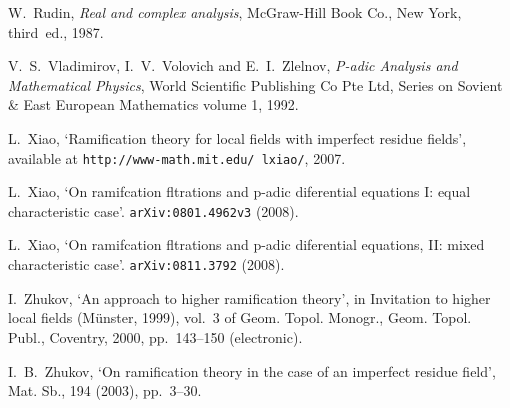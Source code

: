 \documentclass{lmsMODIFIED}
\begin{document}
\begin{thebibliography}{9}
{\sc W.~Rudin}, {\em Real and complex analysis}, McGraw-Hill Book Co., New
  York, third~ed., 1987.

{\sc V.~S.~Vladimirov, I.~V.~Volovich and E.~I.~Zlelnov}, {\em P-adic Analysis and Mathematical Physics}, World Scientific Publishing Co Pte Ltd, Series on Sovient \& East European Mathematics volume 1, 1992.

{\sc L.~Xiao}, {`Ramification theory for local fields with imperfect residue fields'}, available at {\tt http://www-math.mit.edu/~lxiao/}, 2007.

{\sc L.~Xiao}, {`On ramifcation fltrations and p-adic diferential equations {I}: equal characteristic case'}. {\tt arXiv:0801.4962v3} (2008).

{\sc L.~Xiao}, {`On ramifcation fltrations and p-adic diferential equations, {I}{I}: mixed characteristic case'}. {\tt arXiv:0811.3792} (2008).

{\sc I.~Zhukov}, {`An approach to higher ramification theory'}, in Invitation
  to higher local fields (M\"unster, 1999), vol.~3 of Geom. Topol. Monogr.,
  Geom. Topol. Publ., Coventry, 2000, pp.~143--150 (electronic).

{\sc I.~B.~Zhukov}, {`On ramification theory in the case of an imperfect
  residue field'}, Mat. Sb., 194 (2003), pp.~3--30.
\end{thebibliography}

\end{document}
